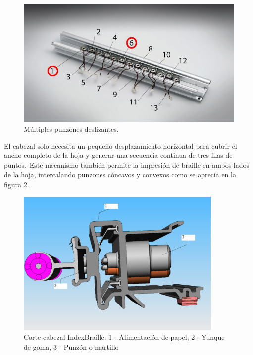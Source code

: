 \begin{figure}[htp]
\centering
\includegraphics[width=12cm]{./img/embosser_index_multiple_hammers.png}
\caption{M\'ultiples punzones deslizantes.}
\label{fig:embosser_index_multiple_hammers}
\end{figure}

El cabezal solo necesita un peque\~no desplazamiento horizontal para cubrir el
ancho completo de la hoja y generar una secuencia continua de tres filas de
puntos.\ 
Este mecanismo tambi\'en permite la impresi\'on de braille en ambos
lados de la hoja, intercalando punzones c\'oncavos y convexos como se aprecia
en la figura \ref{fig:embosser_index_cut_hammers}.

\begin{figure}[htp]
\centering
\includegraphics[width=10cm]{./img/embosser_index_cut_hammers.png}
\caption{Corte cabezal IndexBraille. 1 - Alimentaci\'on de papel, 2 - Yunque de
goma, 3 - Punz\'on o martillo}
\label{fig:embosser_index_cut_hammers}
\end{figure}

